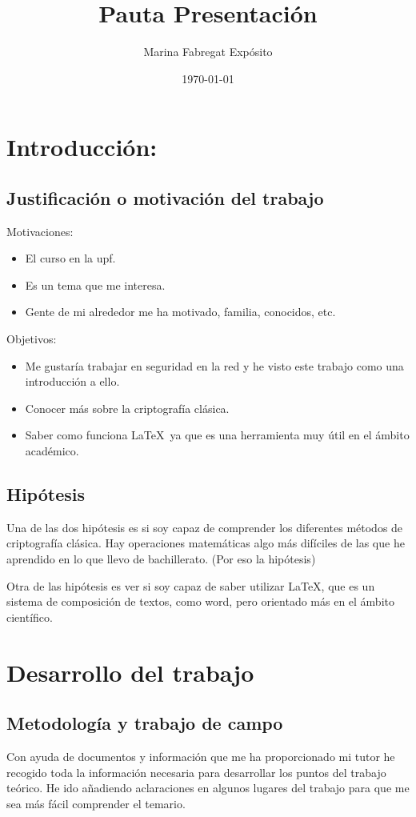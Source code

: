 \documentclass{article}
\title{Pauta Presentación}
\author{Marina Fabregat Expósito}
\date{\today}
\begin{document}
\maketitle

\section{Introducción:}
\subsection{Justificación o motivación del trabajo}

Motivaciones:

\begin{itemize}
    \item El curso en la upf.
    \item Es un tema que me interesa. 
    \item Gente de mi alrededor me ha motivado, familia, conocidos, etc.
\end{itemize}

Objetivos:

\begin{itemize}
    \item Me gustaría trabajar en seguridad en la red y he visto este trabajo como una introducción a ello. 
    \item Conocer más sobre la criptografía clásica.
    \item Saber como funciona \LaTeX$\,$ ya que es una herramienta muy útil en el ámbito académico. 
\end{itemize}
\subsection{Hipótesis}
Una de las dos hipótesis es si soy capaz de comprender los diferentes métodos de criptografía clásica. Hay operaciones matemáticas algo más difíciles de las que he aprendido en lo que llevo de bachillerato. (Por eso la hipótesis)

Otra de las hipótesis es ver si soy capaz de saber utilizar \LaTeX, que es un sistema de composición de textos, como word, pero orientado más en el ámbito científico. 

\section{Desarrollo del trabajo}
\subsection{Metodología y trabajo de campo}
Con ayuda de documentos y información que me ha proporcionado mi tutor he recogido toda la información necesaria para desarrollar los puntos del trabajo teórico. He ido añadiendo aclaraciones en algunos lugares del trabajo para que me sea más fácil comprender el temario. 
\end{document}
